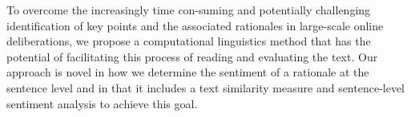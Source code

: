 To overcome the increasingly time con-suming and potentially challenging identification of key points and the associated rationales in large-scale online deliberations, we propose a computational linguistics method that has the potential of facilitating this process of reading and evaluating the text. Our approach is novel in how we determine the sentiment of a rationale at the sentence level and in that it includes a text similarity measure and sentence-level sentiment analysis to achieve this goal.
